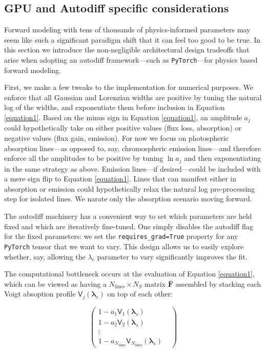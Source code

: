 \documentclass[twocolumn]{aastex631}
\begin{document}
\subsection{GPU and Autodiff specific considerations}

Forward modeling with tens of thousands of physics-informed parameters may seem like such a significant paradigm shift that it can feel too good to be true.  In this section we introduce the non-negligible architectural design tradeoffs that arise when adopting an autodiff framework---such as \texttt{PyTorch}---for physics based forward modeling.  

First, we make a few tweaks to the implementation for numerical purposes. We enforce that all Gaussian and Lorenzian widths are positive by tuning the natural log of the widths, and exponentiate them before inclusion in Equation \ref{equation1}. Based on the minus sign in Equation \ref{equation1}, an amplitude $a_j$ could hypothetically take on either positive values (flux loss, absorption) or negative values (flux gain, emission).  For now we focus on photospheric absorption lines---as opposed to, say, chromospheric emission lines---and therefore enforce all the amplitudes to be positive by tuning $\ln{a_j}$ and then exponentiating in the same strategy as above.  Emission lines---if desired---could be included with a mere sign flip to Equation \ref{equation1}.  Lines that can manifest either in absorption or emission could hypothetically relax the natural log pre-processing step for isolated lines.  We narate only the absorption scenario moving forward.

The autodiff machinery has a convenient way to set which parameters are held fixed and which are iteratively fine-tuned.  One simply disables the autodiff flag for the fixed parameters: we set the \texttt{requires\_grad=True} property for any \texttt{PyTorch} tensor that we want to vary. This design allows us to easily explore whether, say, allowing the $\lambda_\mathrm{c}$ parameter to vary significantly improves the fit.

The computational bottleneck occurs at the evaluation of Equation \ref{equation1}, which can be viewed as having a $N_{\mathrm{lines}}\times N_{S}$ matrix $\bm{\bar{F}}$ assembled by stacking each Voigt absoption profile $\mathsf{V}_j(\bm{\lambda}_s)$ on top of each other:

\begin{equation}
    \begin{pmatrix}
        1 - a_1 \mathsf{V}_1(\bm{\lambda}_s)                                       & \\
        1 - a_2 \mathsf{V}_2(\bm{\lambda}_s)                                       & \\
        \vdots                                                                     & \\
        1 - a_{N_{\mathrm{lines}}} \mathsf{V}_{N_{\mathrm{lines}}}(\bm{\lambda}_s) &
    \end{pmatrix}
\end{equation}
\end{document}
